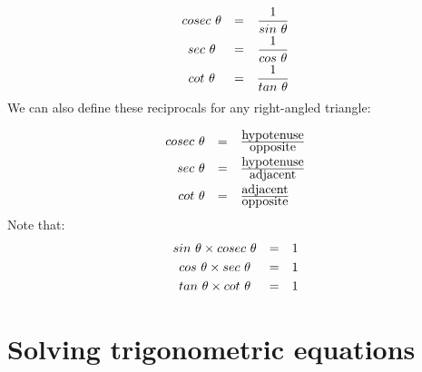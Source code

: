 \begin{equation*}
\begin{array}{ccc}cosec~\theta & =& \dfrac{1}{sin~\theta } \vspace{3pt}\\
 sec~\theta & =& \dfrac{1}{cos~\theta } \vspace{3pt}\\
 cot~\theta & =& \dfrac{1}{tan~\theta }
\end{array}
\end{equation*}
We can also define these reciprocals for any right-angled triangle:

\begin{equation*}
\begin{array}{ccc}\hfill cosec~\theta & =& \frac{\mbox{hypotenuse}}{\mbox{opposite}}\hfill \vspace{3pt}\\
 \hfill sec~\theta & =& \frac{\mbox{hypotenuse}}{\mbox{adjacent}}\hfill \vspace{3pt}\\
 \hfill cot~\theta & =& \frac{\mbox{adjacent}}{\mbox{opposite}}\hfill 
\end{array}
\end{equation*}
Note that:
\begin{equation*}
\begin{array}{ccc}sin~\theta \times cosec~\theta & =& 1 \vspace{3pt}\\
 cos~\theta \times sec~\theta & =& 1 \vspace{3pt}\\
tan~\theta \times cot~\theta & =& 1
\end{array}
\end{equation*}
\section{Solving trigonometric equations}

